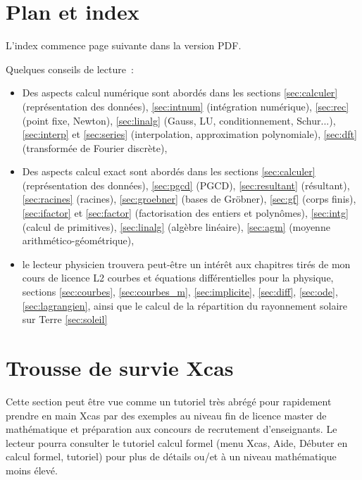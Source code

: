 \documentclass[a4paper,11pt]{book}
\begin{document}
\begin{giacjshere}
\tableofcontents 

\pagebreak 

\chapter{Plan et index} \label{sec:index}
L'index commence page suivante dans la version PDF.

Quelques conseils de lecture~:
\begin{itemize}
\item Des aspects calcul num\'erique sont abord\'es dans les sections
\ref{sec:calculer} (repr\'esentation des donn\'ees), 
\ref{sec:intnum} (int\'egration num\'erique),
\ref{sec:rec} (point fixe, Newton), \ref{sec:linalg} (Gauss, LU,
conditionnement, Schur...), \ref{sec:interp} et \ref{sec:series}
(interpolation, approximation polynomiale),
\ref{sec:dft} (transform\'ee de Fourier discr\`ete),
\item Des aspects calcul exact sont abord\'es dans les sections
\ref{sec:calculer} (repr\'esentation des donn\'ees), 
\ref{sec:pgcd} (PGCD), \ref{sec:resultant}
(r\'esultant), \ref{sec:racines} (racines), \ref{sec:groebner}
(bases de Gr\"obner), \ref{sec:gf} (corps
finis), \ref{sec:ifactor}
et \ref{sec:factor} (factorisation des entiers et polyn\^omes),
\ref{sec:intg} (calcul de primitives), \ref{sec:linalg} (alg\`ebre
lin\'eaire), \ref{sec:agm} (moyenne
arithm\'etico-g\'eom\'etrique), 
\item le lecteur physicien trouvera peut-\^etre un int\'er\^et
aux chapitres tir\'es de mon cours de licence L2 courbes et
\'equations diff\'erentielles pour la physique,
sections \ref{sec:courbes},
\ref{sec:courbes_m}, \ref{sec:implicite}, \ref{sec:diff},
\ref{sec:ode}, \ref{sec:lagrangien}, ainsi que le calcul de la
r\'epartition du rayonnement solaire sur Terre \ref{sec:soleil}
\end{itemize}
\printindex


\pagebreak

\chapter{Trousse de survie Xcas} \label{sec:survie}
Cette section peut \^etre vue comme un tutoriel tr\`es abr\'eg\'e 
pour rapidement
prendre en main Xcas par des exemples au niveau fin de licence
master de math\'ematique et pr\'eparation aux concours de recrutement
d'enseignants. Le lecteur pourra consulter le tutoriel calcul
formel (menu Xcas, Aide, D\'ebuter en calcul formel, tutoriel) pour
plus de d\'etails ou/et \`a un niveau math\'ematique moins \'elev\'e.


\end{giacjshere}
\end{document}
